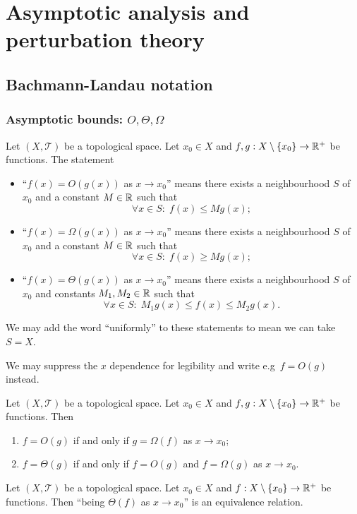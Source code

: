 \chapter{Asymptotic analysis and perturbation theory}
\section{Bachmann-Landau notation}
\subsection{Asymptotic bounds: $O, \Theta, \Omega$}
\begin{definition}
Let $(X,\mathcal{T})$ be a topological space. Let $x_0 \in X$ and $f,g: X\setminus\{x_0\}\to \mathbb{R}^+$ be functions. The statement
\begin{itemize}
\item ``$f(x) = O(g(x))$ as $x\to x_0$'' means there exists a neighbourhood $S$ of $x_0$ and a constant $M\in\mathbb{R}$ such that
\[ \forall x\in S:\; f(x) \leq Mg(x); \]
\item ``$f(x) = \Omega(g(x))$ as $x\to x_0$'' means there exists a neighbourhood $S$ of $x_0$ and a constant $M\in\mathbb{R}$ such that
\[ \forall x\in S:\; f(x) \geq Mg(x); \]
\item ``$f(x) = \Theta(g(x))$ as $x\to x_0$'' means there exists a neighbourhood $S$ of $x_0$ and constants $M_1,M_2\in\mathbb{R}$ such that
\[ \forall x\in S:\; M_1g(x) \leq f(x) \leq M_2g(x). \]
\end{itemize}
We may add the word ``uniformly'' to these statements to mean we can take $S=X$.

We may suppress the $x$ dependence for legibility and write e.g\ $f = O(g)$ instead.
\end{definition}

\begin{lemma}
Let $(X,\mathcal{T})$ be a topological space. Let $x_0 \in X$ and $f,g: X\setminus\{x_0\}\to \mathbb{R}^+$ be functions. Then
\begin{enumerate}
\item $f = O(g)$ \textup{if and only if} $g = \Omega(f)$ as $x\to x_0$;
\item $f = \Theta(g)$ \textup{if and only if} $f = O(g)$ and $f = \Omega(g)$ as $x\to x_0$.
\end{enumerate}
\end{lemma}

\begin{lemma}
Let $(X,\mathcal{T})$ be a topological space. Let $x_0 \in X$ and $f: X\setminus\{x_0\}\to \mathbb{R}^+$ be functions. Then ``being $\Theta(f)$ as $x\to x_0$'' is an equivalence relation.
\end{lemma}

